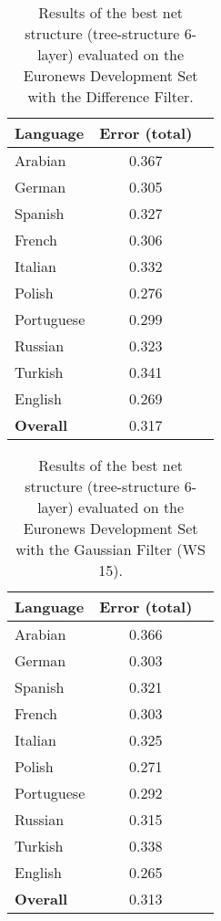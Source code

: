 \begin{table}[!htbp]
\centering
\caption{Results of the best net structure (tree-structure 6-layer) evaluated on the Euronews Development Set with the Difference Filter.}
\label{tab:difference}
\begin{tabular}{| l | c | r | }
	\hline
	\textbf{Language} & \textbf{Error (total) }  \\
	\hline
	Arabian & 0.367  \\
	German & 0.305  \\
	Spanish & 0.327 \\ 
	French & 0.306 \\
	Italian & 0.332  \\
	Polish & 0.276 \\
	Portuguese& 0.299  \\
	Russian&  0.323 \\
	Turkish&  0.341 \\
	English&  0.269 \\
	\hline
	\textbf{Overall} & 0.317 \\
	\hline
\end{tabular}
\end{table}

\begin{table}[!htbp]
\centering
\caption{Results of the best net structure (tree-structure 6-layer) evaluated on the Euronews Development Set with the Gaussian Filter (WS 15).}
\label{tab:gauss}
\begin{tabular}{| l | c | r | }
	\hline
	\textbf{Language} & \textbf{Error (total) }  \\
	\hline
	Arabian & 0.366  \\
	German & 0.303  \\
	Spanish & 0.321 \\ 
	French & 0.303 \\
	Italian & 0.325  \\
	Polish & 0.271 \\
	Portuguese& 0.292 \\
	Russian&  0.315 \\
	Turkish&  0.338 \\
	English&  0.265 \\
	\hline
	\textbf{Overall} & 0.313 \\
	\hline
\end{tabular}
\end{table}

